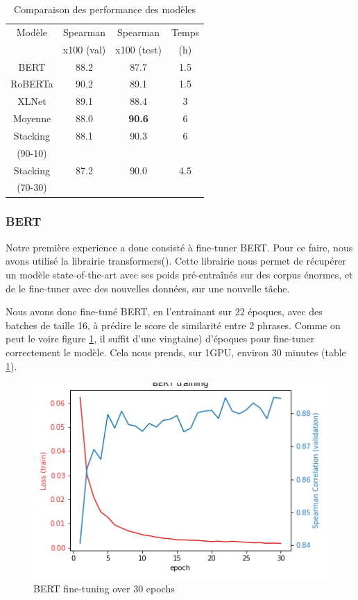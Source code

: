 \documentclass[11pt,a4paper, french]{article}
\begin{document}
\begin{table}[h!]
\centering
\begin{tabular}{|c| c c c|}
 \hline
 Modèle & Spearman & Spearman & Temps \\[0.5ex]
 & x100 (val) & x100 (test) & (h) \\
 \hline\hline
 BERT     & 88.2 & 87.7 & 1.5 \\
 \hline
 RoBERTa  & 90.2 & 89.1 & 1.5 \\
 \hline
 XLNet    & 89.1 & 88.4 & 3 \\
 \hline
 Moyenne  & 88.0 & \textbf{90.6} & 6 \\
 \hline
 Stacking & 88.1 & 90.3 & 6 \\
 (90-10)  & & & \\
 \hline
 Stacking & 87.2 & 90.0 & 4.5 \\
 (70-30)  &  & & \\
 \hline
 \hline
\end{tabular}
\caption{Comparaison des performance des modèles}
\label{table:models:results}
\end{table}
%
\subsubsection{BERT}

Notre première experience a donc consisté à fine-tuner BERT. Pour ce faire, nous avons utilisé la librairie transformers(\cite{huggingface}). Cette librairie nous permet de récupérer un modèle state-of-the-art avec ses poids pré-entraînés sur des corpus énormes, et de le fine-tuner avec des nouvelles données, sur une nouvelle tâche.

Nous avons donc fine-tuné BERT, en l'entrainant sur 22 époques, avec des batches de taille 16, à prédire le score de similarité entre 2 phrases. Comme on peut le voire figure \ref{fig:BERT:finetunning}, il suffit d'une vingtaine) d'époques pour fine-tuner correctement le modèle. Cela nous prends, sur 1GPU, environ 30 minutes (table \ref{table:models:results}).

\begin{figure}
  \includegraphics[width=\linewidth]{resources/bert-training.png}
  \caption{BERT fine-tuning over 30 epochs}
  \label{fig:BERT:finetunning}
\end{figure}
\end{document}
